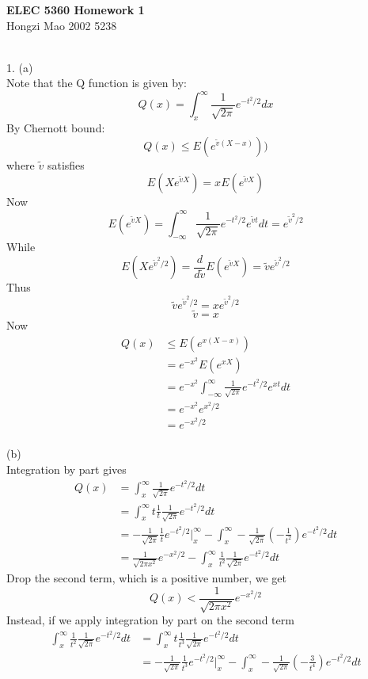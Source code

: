 \documentclass [12pt] {article}
\begin{document}
\begin{spacing}{1.5}
\begin{center}
\small
\textbf{ELEC 5360 Homework 1}\\ Hongzi Mao 2002 5238\\
\end{center}
\normalsize
~\\
1. (a)\\
Note that the Q function is given by: $$ Q(x) = \int_x^\infty \frac{1}{\sqrt{2\pi}}e^{-t^2/2} dx $$
By Chernott bound: $$ Q(x)\leq E(e^{\widetilde{v}(X-x)})) $$
where $\widetilde{v}$ satisfies $$E(X e^{\widetilde{v} X}) = x E(e^{\widetilde{v} X})$$
Now $$ E(e^{\widetilde{v} X}) = \int_{-\infty}^{\infty} \frac{1}{\sqrt{2\pi}}e^{-t^2/2}e^{\widetilde{v} t} dt = e^{\widetilde{v}^2/2} $$
While $$E(X e^{\widetilde{v}^2/2}) = \frac{d}{d \widetilde{v}} E(e^{\widetilde{v} X}) = \widetilde{v} e^{\widetilde{v}^2/2} $$
Thus $$ \widetilde{v} e^{\widetilde{v}^2/2} = x e^{\widetilde{v}^2/2} $$
$$ \widetilde{v} = x $$
Now \begin{align*}
 Q(x) &\leq E(e^{x (X - x)}) \\
& = e^{-x^2} E(e^{x X})\\
& = e^{-x^2} \int_{-\infty}^{\infty} \frac{1}{\sqrt{2\pi}} e^{-t^2/2} e^{x t} dt\\
& = e^{-x^2} e^{x^2/2}\\
& = e^{-x^2/2}
\end{align*}
~\\
(b)\\
Integration by part gives \begin{align*}
Q(x) &= \int_x^\infty \frac{1}{\sqrt{2\pi}}e^{-t^2/2} dt\\
&= \int_x^\infty t \frac{1}{t} \frac{1}{\sqrt{2\pi}}e^{-t^2/2} dt\\
&= -\frac{1}{\sqrt{2\pi}} \frac{1}{t} e^{-t^2/2}\Big|_x^\infty - \int_x^\infty -\frac{1}{\sqrt{2\pi}} (- \frac{1}{t^2})e^{-t^2/2} dt\\
&= \frac{1}{\sqrt{2\pi x^2}} e^{-x^2/2} -  \int_x^\infty \frac{1}{t^2} \frac{1}{\sqrt{2\pi}}e^{-t^2/2} dt
\end{align*}
Drop the second term, which is a positive number, we get
$$ Q(x) < \frac{1}{\sqrt{2\pi x^2}} e^{-x^2/2}$$
Instead, if we apply integration by part on the second term  \begin{align*}
\int_x^\infty \frac{1}{t^2} \frac{1}{\sqrt{2\pi}}e^{-t^2/2} dt &= \int_x^\infty t \frac{1}{t^3} \frac{1}{\sqrt{2\pi}}e^{-t^2/2} dt\\
&= -\frac{1}{\sqrt{2\pi}} \frac{1}{t^3} e^{-t^2/2}\Big|_x^\infty - \int_x^\infty -\frac{1}{\sqrt{2\pi}} (- \frac{3}{t^4})e^{-t^2/2} dt\\

\end{align*}
\end{spacing}
\end{document}
